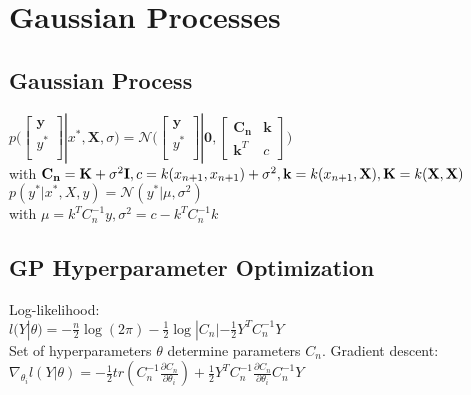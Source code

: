 \section{Gaussian Processes}
\subsection*{Gaussian Process}
$p\big(\begin{bmatrix}
\mathbf{y} \\
y^*\\
\end{bmatrix}|x^*,\mathbf{X}, \sigma \big) = \mathcal{N}\big(\begin{bmatrix}
\mathbf{y} \\
y^*\\
\end{bmatrix} | \mathbf{0},\begin{bmatrix}
\mathbf{C_n} & \mathbf{k} \\
\mathbf{k}^T & c 
\end{bmatrix}  \big)$\\
with $\mathbf{C_n} = \mathbf{K} + \sigma^2 \mathbf{I}, c = k(x_{n+1},x_{n+1}) + \sigma^2,\\
\mathbf{k}=k(x_{n+1}, \mathbf{X}), \mathbf{K}=k(\mathbf{X}, \mathbf{X})$\\
$p(y^*|x^*, X, y) = \mathcal{N}(y^*|\mu, \sigma^2)$\\
with $\mu = k^T C_n^{-1}y, \sigma^2 = c-k^TC_n^{-1}k$

\subsection*{GP Hyperparameter Optimization}
Log-likelihood:\\
$l(Y|\theta) = -\frac{n}{2} \log(2\pi) - \frac{1}{2} \log |C_n| - \frac{1}{2} Y^T C_n^{-1}Y$\\
Set of hyperparameters $\theta$ determine parameters $C_n$. Gradient descent: $\nabla_{\theta_i}l(Y|\theta) = -\frac{1}{2}tr(C_n^{-1} \frac{\partial C_n}{\partial \theta_i}) + \frac{1}{2} Y^T C_n^{-1} \frac{\partial C_n}{\partial \theta_i} C_n^{-1} Y$

